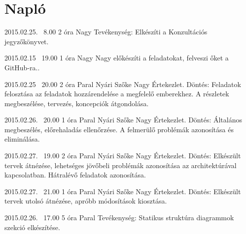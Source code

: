 %
\section{Napló}

\begin{naplo}

\bejegyzes
{2015.02.25. ~8.00}
{2 óra}
{Nagy} 
{Tevékenység: Elkészíti a Konzultációs jegyzőkönyvet.\newline } 

\bejegyzes
{2015.02.15 ~19.00}
{1 óra}
{Nagy} 
{Nagy előkészíti a feladatokat, felveszi őket a GitHub-ra..} 

\bejegyzes
{2015.02.25 ~20.00}
{2 óra}
{Paral \newline Nyári \newline Szőke \newline Nagy} 
{Értekezlet.
Döntés: Feladatok felosztása az feladatok hozzárendelése a megfelelő emberekhez. A részletek megbeszélése, tervezés, koncepciók átgondolása.\newline } 

\bejegyzes
{2015.02.26. ~20.00}
{1 óra}
{Paral \newline Nyári \newline Szőke \newline Nagy} 
{Értekezlet.
Döntés: Általános megbeszélés, előrehaladás ellenőrzése. A felmerülő problémák azonosítása és eliminálása. \newline } 

\bejegyzes
{2015.02.27. ~19.00}
{2 óra}
{Paral \newline Nyári \newline Szőke \newline Nagy} 
{Értekezlet.
Döntés: Elkészült tervek átnézése, lehetséges jövőbeli problémák azonosítása az architektúrával kapcsolatban. Hátralévő feladatok azonosítása.\newline } 

\bejegyzes
{2015.02.27. ~21.00}
{1 óra}
{Paral \newline Nyári \newline Szőke \newline Nagy} 
{Értekezlet.
Döntés: Elkészült tervek utolsó átnézése, apróbb módosítások kiosztása.\newline } 

\bejegyzes
{2015.02.26. ~17.00}
{5 óra}
{Paral} 
{Tevékenység: Statikus struktúra diagrammok szekció elkészítése.\newline } 


\end{naplo}
